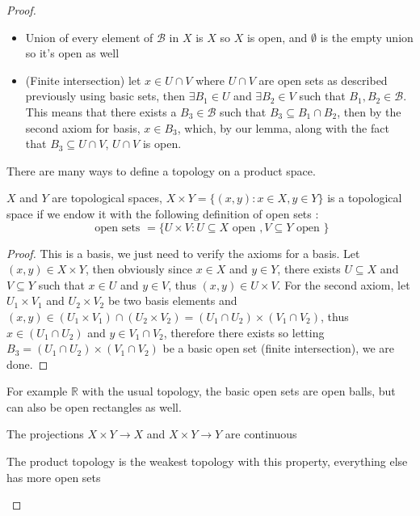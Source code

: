 \documentclass{tufte-handout}
\begin{document}
\begin{proof}
	\begin{itemize}
		\item Union of every element of $\mathcal{B}$ in $X$ is $X$ so $X$ is open, and $\emptyset$ is the empty union so it's open as well
		\item (Finite intersection) let $x \in U \cap V$ where $U \cap V$ are open sets as described previously using basic sets, then $\exists B_1 \in U$ and $\exists B_2 \in V$ such that $B_1, B_2 \in \mathcal{B}$. This means that there exists a $B_3 \in \mathcal{B}$ such that $B_3 \subseteq B_1 \cap B_2$, then by the second axiom for basis, $x \in B_3$, which, by our lemma, along with the fact that $B_3 \subseteq U \cap V$, $U \cap V$ is open.
	\end{itemize}
	There are many ways to define a topology on a product space.
	\begin{definition}
		$X$ and $Y$ are topological spaces, $X \times Y = \{(x,y) \colon x \in X, y \in Y\}$ is a topological space if we endow it with the following definition of open sets : $$\text{ open sets } = \{ U \times V \colon U \subseteq X \text{ open }, V \subseteq Y \text { open } \}$$	
	\end{definition}
	\begin{proof}
		This is a basis, we just need to verify the axioms for a basis. Let $(x,y) \in X \times Y$, then obviously since $x \in X$ and $y \in Y$, there exists $U \subseteq X$ and $V \subseteq Y$ such that $x \in U$ and $y \in V$, thus $(x,y) \in U \times V$. For the second axiom, let $U_1 \times V_1$ and $U_2 \times V_2$ be two basis elements and $(x,y) \in (U_1 \times V_1 ) \cap (U_2 \times V_2) = (U_1 \cap U_2) \times (V_1 \cap V_2)$, thus $x \in (U_1 \cap U_2)$ and $y \in V_1 \cap V_2$, therefore there exists so letting $B_3 = (U_1 \cap U_2) \times ( V_1 \cap V_2)$ be a basic open set (finite intersection), we are done. 

	\end{proof}
	For example $\mathbb{R}$ with the usual topology, the basic open sets are open balls, but can also be open rectangles as well. 
	\begin{lemma}\label{lem:1}
			The projections $X \times Y \to X$ and $X \times Y \to Y$ are continuous
	\end{lemma}
	\begin{lemma}\label{lem:2}
		The product topology is the weakest topology with this property, everything else has more open sets


\end{lemma}
\end{proof}
\end{document}
